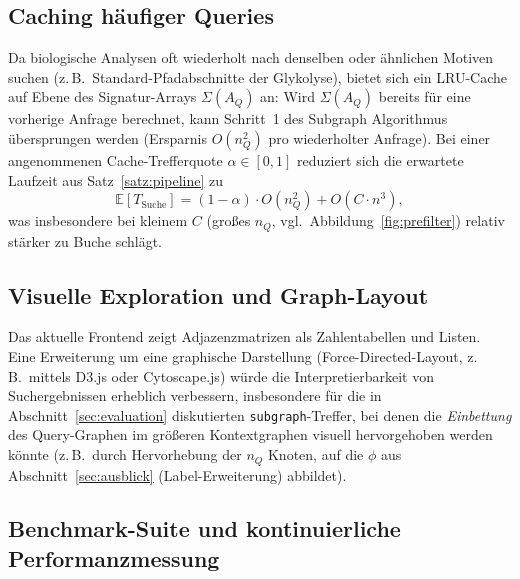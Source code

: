 \documentclass[a4paper,12pt]{article}
\theoremstyle{definition}
\begin{document}
\subsection{Caching häufiger Queries}

Da biologische Analysen oft wiederholt nach denselben oder ähnlichen Motiven suchen (z.\,B.\ Standard-Pfadabschnitte der Glykolyse), bietet sich ein LRU-Cache auf Ebene des Signatur-Arrays $\Sigma(A_Q)$ an: Wird $\Sigma(A_Q)$ bereits für eine vorherige Anfrage berechnet, kann Schritt~1 des Subgraph Algorithmus übersprungen werden (Ersparnis $O(n_Q^2)$ pro wiederholter Anfrage). Bei einer angenommenen Cache-Trefferquote $\alpha\in[0,1]$ reduziert sich die erwartete Laufzeit aus Satz~\ref{satz:pipeline} zu
\[
\mathbb{E}[T_{\text{Suche}}] = (1-\alpha)\cdot O(n_Q^2) + O(C\cdot n^3),
\]
was insbesondere bei kleinem $C$ (großes $n_Q$, vgl.\ Abbildung~\ref{fig:prefilter}) relativ stärker zu Buche schlägt.

\subsection{Visuelle Exploration und Graph-Layout}

Das aktuelle Frontend zeigt Adjazenzmatrizen als Zahlentabellen und Listen. Eine Erweiterung um eine graphische Darstellung (Force-Directed-Layout, z.\,B.\ mittels D3.js oder Cytoscape.js) würde die Interpretierbarkeit von Suchergebnissen erheblich verbessern, insbesondere für die in Abschnitt~\ref{sec:evaluation} diskutierten \texttt{subgraph}-Treffer, bei denen die \emph{Einbettung} des Query-Graphen im größeren Kontextgraphen visuell hervorgehoben werden könnte (z.\,B.\ durch Hervorhebung der $n_Q$ Knoten, auf die $\phi$ aus Abschnitt~\ref{sec:ausblick} (Label-Erweiterung) abbildet).

\subsection{Benchmark-Suite und kontinuierliche Performanzmessung}
\end{document}
